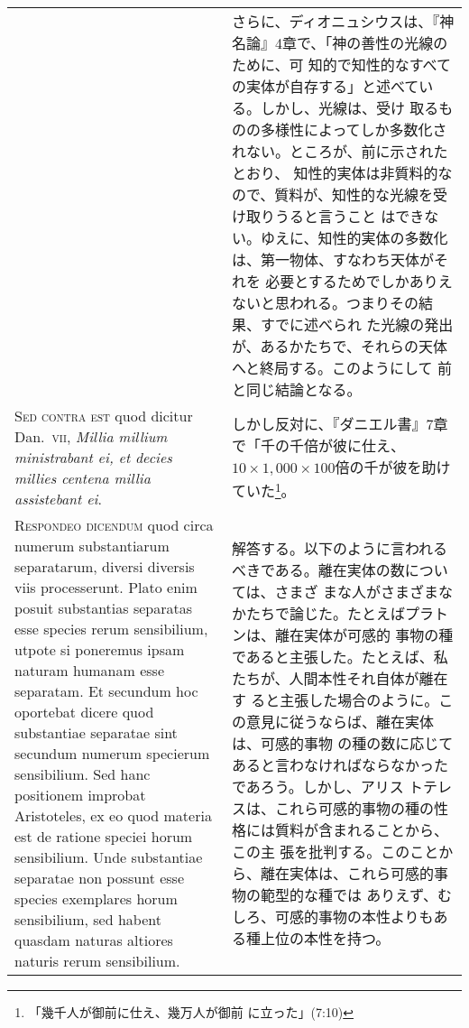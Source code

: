 \documentclass[10pt]{jsarticle} %
\begin{document}
\begin{longtable}{p{21em}p{21em}}
&

さらに、ディオニュシウスは、『神名論』4章で、「神の善性の光線のために、可
 知的で知性的なすべての実体が自存する」と述べている。しかし、光線は、受け
 取るものの多様性によってしか多数化されない。ところが、前に示されたとおり、
 知性的実体は非質料的なので、質料が、知性的な光線を受け取りうると言うこと
 はできない。ゆえに、知性的実体の多数化は、第一物体、すなわち天体がそれを
 必要とするためでしかありえないと思われる。つまりその結果、すでに述べられ
 た光線の発出が、あるかたちで、それらの天体へと終局する。このようにして
 前と同じ結論となる。


\\


{\scshape Sed contra est} quod dicitur Dan.~{\scshape vii}, {\itshape Millia
millium ministrabant ei, et decies millies centena millia assistebant
ei}.

&
しかし反対に、『ダニエル書』7章で「千の千倍が彼に仕え、$10 \times 1,000 \times
 100$倍の千が彼を助けていた\footnote{「幾千人が御前に仕え、幾万人が御前
 に立った」(7:10)}。

\\


{\scshape Respondeo dicendum} quod circa numerum
substantiarum separatarum, diversi diversis viis processerunt. Plato
enim posuit substantias separatas esse species rerum sensibilium, utpote
si poneremus ipsam naturam humanam esse separatam. Et secundum hoc
oportebat dicere quod substantiae separatae sint secundum numerum
specierum sensibilium. Sed hanc positionem improbat Aristoteles, ex eo
quod materia est de ratione speciei horum sensibilium. Unde substantiae
separatae non possunt esse species exemplares horum sensibilium, sed
habent quasdam naturas altiores naturis rerum sensibilium. 



&

解答する。以下のように言われるべきである。離在実体の数については、さまざ
 まな人がさまざまなかたちで論じた。たとえばプラトンは、離在実体が可感的
 事物の種であると主張した。たとえば、私たちが、人間本性それ自体が離在す
 ると主張した場合のように。この意見に従うならば、離在実体は、可感的事物
 の種の数に応じてあると言わなければならなかったであろう。しかし、アリス
 トテレスは、これら可感的事物の種の性格には質料が含まれることから、この主
 張を批判する。このことから、離在実体は、これら可感的事物の範型的な種では
 ありえず、むしろ、可感的事物の本性よりもある種上位の本性を持つ。


\\


\end{longtable}
\end{document}
